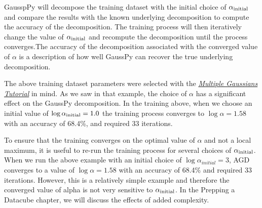 \documentclass[letterpaper,10pt,openany,oneside]{sphinxmanual}
\begin{document}
GausspPy will decompose the training dataset with the initial choice of \(\alpha_{\rm initial}\) and compare the results with the known underlying decomposition to compute the accuracy of the decomposition. The training process will then iteratively change the value of \(\alpha_{\rm initial}\) and recompute the decomposition until the process converges.The accuracy of the decomposition associated with the converged value of \(\alpha\) is a description of how well GaussPy can recover the true underlying decomposition.

The above training dataset parameters were selected with the {\hyperref[tutorial:multiple\string-gaussians\string-tutorial]{\emph{Multiple Gaussians Tutorial}}} in mind. As we saw in that example, the choice of \(\alpha\) has a significant effect on the GaussPy decomposition. In the training above, when we choose an initial value of \(\log\alpha_{\rm initial}=1.0\) the training process converges to \(\log\alpha=1.58\) with an accuracy of 68.4\%, and required 33 iterations.

To ensure that the training converges on the optimal value of \(\alpha\) and not a local maximum, it is useful to re-run the training process for several choices of \(\alpha_{\rm initial}\). When we run the above example with an initial choice of \(\log\alpha_{initial}=3\), AGD converges to a value of \(\log\alpha=1.58\) with an accuracy of 68.4\% and required 33 iterations. However, this is a relatively simple example and therefore the converged value of alpha is not very sensitive to \(\alpha_{\rm initial}\). In the Prepping a Datacube chapter, we will discuss the effects of added complexity.
\end{document}
